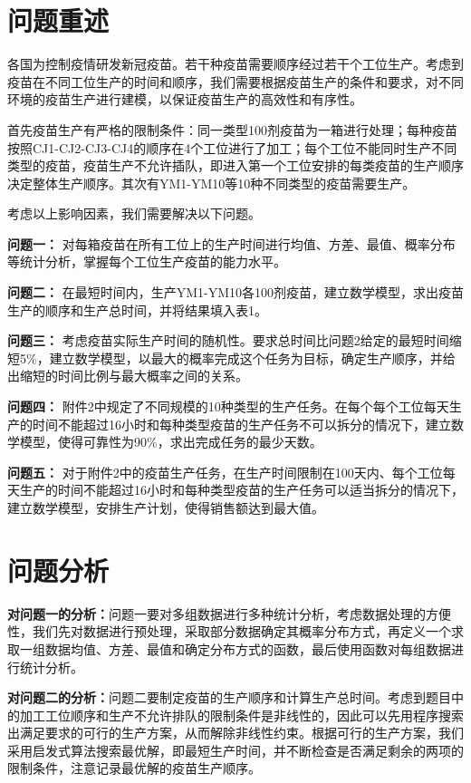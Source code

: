 \documentclass[UTF8]{ctexart}
\begin{document}
	
	 \songti
	
	\tableofcontents
	\newpage
	
	\section{问题重述}
	各国为控制疫情研发新冠疫苗。若干种疫苗需要顺序经过若干个工位生产。考虑到疫苗在不同工位生产的时间和顺序，我们需要根据疫苗生产的条件和要求，对不同环境的疫苗生产进行建模，以保证疫苗生产的高效性和有序性。
	
	首先疫苗生产有严格的限制条件：同一类型100剂疫苗为一箱进行处理；每种疫苗按照CJ1-CJ2-CJ3-CJ4的顺序在4个工位进行了加工；每个工位不能同时生产不同类型的疫苗，疫苗生产不允许插队，即进入第一个工位安排的每类疫苗的生产顺序决定整体生产顺序。其次有YM1-YM10等10种不同类型的疫苗需要生产。
	
	考虑以上影响因素，我们需要解决以下问题。
	
	\textbf{问题一：}
	对每箱疫苗在所有工位上的生产时间进行均值、方差、最值、概率分布等统计分析，掌握每个工位生产疫苗的能力水平。
	
	\textbf{问题二：}
	在最短时间内，生产YM1-YM10各100剂疫苗，建立数学模型，求出疫苗生产的顺序和生产总时间，并将结果填入表1。
	
	\textbf{问题三：}
	考虑疫苗实际生产时间的随机性。要求总时间比问题2给定的最短时间缩短5\%，建立数学模型，以最大的概率完成这个任务为目标，确定生产顺序，并给出缩短的时间比例与最大概率之间的关系。
	
	\textbf{问题四：}
	附件2中规定了不同规模的10种类型的生产任务。在每个每个工位每天生产的时间不能超过16小时和每种类型疫苗的生产任务不可以拆分的情况下，建立数学模型，使得可靠性为90\%，求出完成任务的最少天数。
	
	\textbf{问题五：}
	对于附件2中的疫苗生产任务，在生产时间限制在100天内、每个工位每天生产的时间不能超过16小时和每种类型疫苗的生产任务可以适当拆分的情况下，建立数学模型，安排生产计划，使得销售额达到最大值。
	
	\section{问题分析}
	\textbf{对问题一的分析：}问题一要对多组数据进行多种统计分析，考虑数据处理的方便性，我们先对数据进行预处理，采取部分数据确定其概率分布方式，再定义一个求取一组数据均值、方差、最值和确定分布方式的函数，最后使用函数对每组数据进行统计分析。
	
	\textbf{对问题二的分析：}问题二要制定疫苗的生产顺序和计算生产总时间。考虑到题目中的加工工位顺序和生产不允许排队的限制条件是非线性的，因此可以先用程序搜索出满足要求的可行的生产方案，从而解除非线性约束。根据可行的生产方案，我们采用启发式算法搜索最优解，即最短生产时间，并不断检查是否满足剩余的两项的限制条件，注意记录最优解的疫苗生产顺序。
	
\end{document}
